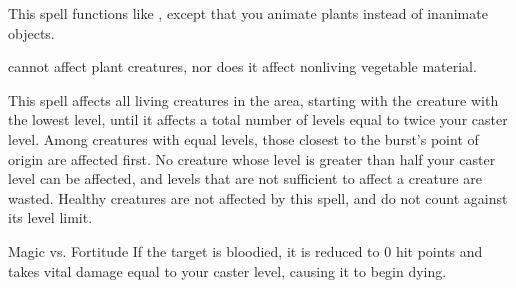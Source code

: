 \begin{spellheader}
\end{spellheader}
\begin{spellcontent}
    \begin{spelltargetinginfo}
    \end{spelltargetinginfo}
    \begin{spelleffects}
        \spelleffect This spell functions like , except that you animate plants instead of inanimate objects.
    \end{spelleffects}
\end{spellcontent}
\begin{spellfooter}
    \spellnotes {} cannot affect plant creatures, nor does it affect nonliving vegetable material.
\end{spellfooter}


\begin{spellheader}
\end{spellheader}
\begin{spellcontent}
    \begin{spelltargetinginfo}
    \end{spelltargetinginfo}
    \begin{spelleffects}
        \spelleffect This spell affects all \bloodied living creatures in the area, starting with the creature with the lowest level, until it affects a total number of levels equal to twice your caster level. Among creatures with equal levels, those closest to the burst's point of origin are affected first. No creature whose level is greater than half your caster level can be affected, and levels that are not sufficient to affect a creature are wasted. Healthy creatures are not affected by this spell, and do not count against its level limit.
        \begin{spellattack}{Magic vs. Fortitude}
            \spellsuccess If the target is bloodied, it is reduced to 0 hit points and takes vital damage equal to your caster level, causing it to begin dying.
        \end{spellattack}
    \end{spelleffects}
\end{spellcontent}
\begin{spellfooter}
\end{spellfooter}

